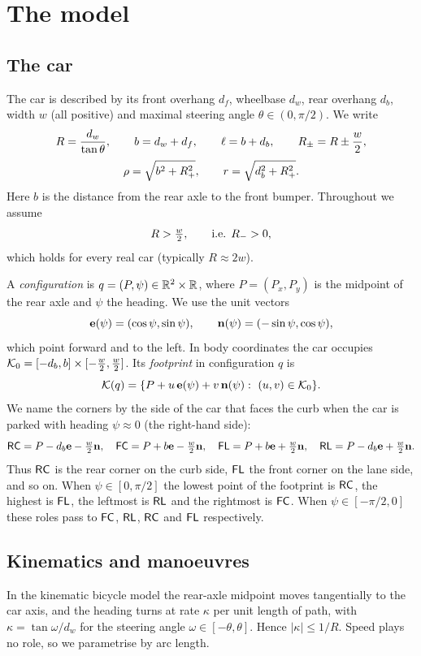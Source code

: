 \section{The model}\label{sec:model}

\subsection{The car}
The car is described by its front overhang $d_f$, wheelbase $d_w$, rear overhang $d_b$, width $w$ (all positive) and maximal steering angle $\theta\in(0,\pi/2)$.
We write
\[
  R=\frac{d_w}{\tan\theta},\qquad b=d_w+d_f,\qquad \ell=b+d_b,\qquad R_{\pm}=R\pm\frac w2,
\]
\[
  \rho=\sqrt{b^2+R_{+}^2},\qquad r=\sqrt{d_b^2+R_{+}^2}.
\]
Here $b$ is the distance from the rear axle to the front bumper.
Throughout we assume
\begin{equation}\label{eq:standing}
  R>\tfrac w2,\qquad\text{i.e. } R_{-}>0,
\end{equation}
which holds for every real car (typically $R\approx 2w$).

A \emph{configuration} is $q=(P,\psi)\in\mathbb{R}^2\times\mathbb{R}$, where $P=(P_x,P_y)$ is the midpoint of the rear axle and $\psi$ the heading.
We use the unit vectors
\[
  \mathbf{e}(\psi)=(\cos\psi,\sin\psi),\qquad \mathbf{n}(\psi)=(-\sin\psi,\cos\psi),
\]
which point forward and to the left.
In body coordinates the car occupies $\mathcal{K}_0=[-d_b,b]\times[-\tfrac w2,\tfrac w2]$.
Its \emph{footprint} in configuration $q$ is
\[
  \fp(q)=\{P+u\,\e(\psi)+v\,\n(\psi):\ (u,v)\in\fp_0\}.
\]
We name the corners by the side of the car that faces the curb when the car is parked with heading $\psi\approx0$ (the right-hand side):
\[
  \mathsf{RC}=P-d_b\mathbf{e}-\tfrac w2\mathbf{n},\quad \mathsf{FC}=P+b\mathbf{e}-\tfrac w2\mathbf{n},\quad \mathsf{FL}=P+b\mathbf{e}+\tfrac w2\mathbf{n},\quad \mathsf{RL}=P-d_b\mathbf{e}+\tfrac w2\mathbf{n} .
\]
Thus $\mathsf{RC}$ is the rear corner on the curb side, $\mathsf{FL}$ the front corner on the lane side, and so on.
When $\psi\in[0,\pi/2]$ the lowest point of the footprint is $\mathsf{RC}$, the highest is $\mathsf{FL}$, the leftmost is $\mathsf{RL}$ and the rightmost is $\mathsf{FC}$.
When $\psi\in[-\pi/2,0]$ these roles pass to $\mathsf{FC}$, $\mathsf{RL}$, $\mathsf{RC}$ and $\mathsf{FL}$ respectively.

\subsection{Kinematics and manoeuvres}
In the kinematic bicycle model the rear-axle midpoint moves tangentially to the car axis, and the heading turns at rate $\kappa$ per unit length of path, with $\kappa=\tan\omega/d_w$ for the steering angle $\omega\in[-\theta,\theta]$.
Hence $|\kappa|\le1/R$.
Speed plays no role, so we parametrise by arc length.


